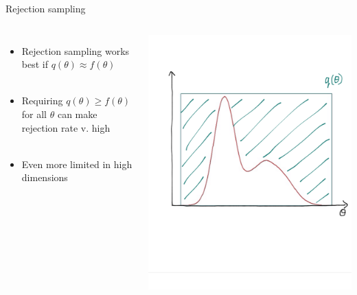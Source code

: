 \documentclass[compress]{beamer}
\begin{document}
\begin{frame}[label=sec-5-9]{Rejection sampling}
\begin{columns}[c] 
\begin{itemize}
\item Rejection sampling works best if $q(\theta) \approx f(\theta)$ \\~\\
\item Requiring $q(\theta) \geqslant f(\theta)$ for all $\theta$ can make rejection rate v. high\\~\\
\item Even more limited in high dimensions
\end{itemize}

\includegraphics[width=1\linewidth]{RS23.png}
\end{columns}
\end{frame}
\end{document}

